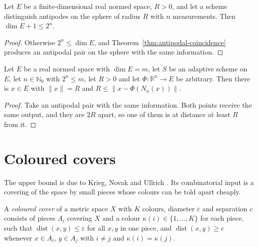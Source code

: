 \begin{corollary}
\label{cor:counting}
\leanok
{}
Let $E$ be a finite-dimensional real normed space, $R > 0$, and let a scheme
distinguish antipodes on the sphere of radius $R$ with $n$ measurements. Then
$\dim E + 1 \le 2^n$.
\end{corollary}
\begin{proof}
\leanok
{}
Otherwise $2^n \le \dim E$, and Theorem~\ref{thm:antipodal-coincidence} produces an
antipodal pair on the sphere with the same information.
\end{proof}

\begin{corollary}
\label{cor:lower-error}
\leanok
Let $E$ be a real normed space with $\dim E = m$, let $S$ be an adaptive scheme on $E$,
let $n \in \mathbb{N}_0$ with $2^n \le m$, let $R > 0$ and let
$\Phi : \mathbb{R}^n \to E$ be arbitrary. Then there is $x \in E$ with $\|x\| = R$ and
$R \le \|x - \Phi(N_n(x))\|$.
\end{corollary}
\begin{proof}
\leanok
{}
Take an antipodal pair with the same information. Both points receive the same output,
and they are $2R$ apart, so one of them is at distance at least $R$ from it.
\end{proof}

\chapter{Coloured covers}
\label{ch:colored}

The upper bound is due to Krieg, Novak and Ullrich \cite{KNU}. Its combinatorial
input is a covering of the space by small pieces whose colours can be told apart
cheaply.

\begin{definition}
\label{def:colored-cover}
\leanok
A \emph{coloured cover} of a metric space $X$ with $K$ colours, diameter $\varepsilon$
and separation $c$ consists of pieces $A_i$ covering $X$ and a colour
$\kappa(i) \in \{1, \dots, K\}$ for each piece, such that
$\operatorname{dist}(x, y) \le \varepsilon$ for all $x, y$ in one piece, and
$\operatorname{dist}(x, y) \ge c$ whenever $x \in A_i$, $y \in A_j$ with $i \neq j$ and
$\kappa(i) = \kappa(j)$.
\end{definition}

